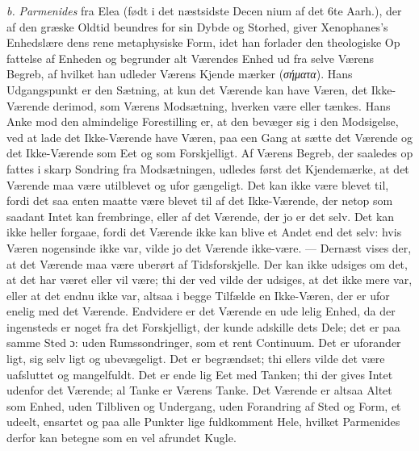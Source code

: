 \documentclass[12pt,a4paper]{book}
\newcommand{\gk}[1]{\textit{#1}}
\begin{document}
\textit{b.} \emph{Parmenides} fra Elea (født i det næstsidste Decen\-%
nium af det 6te Aarh.), der af den græske Oldtid beundres for
sin Dybde og Storhed, giver Xenophanes's Enhedslære dens
rene metaphysiske Form, idet han forlader den theologiske Op\-%
fattelse af Enheden og begrunder alt Værendes Enhed ud fra
%
%
%
selve Værens Begreb, af hvilket han udleder Værens Kjende\-%
mærker (\gk{σήματα}). Hans Udgangspunkt er den Sætning, at
kun det Værende kan have Væren, det Ikke-Værende derimod,
som Værens Modsætning, hverken være eller tænkes. Hans
Anke mod den almindelige Forestilling er, at den bevæger sig
i den Modsigelse, ved at lade det Ikke-Værende have Væren,
paa een Gang at sætte det Værende og det Ikke-Værende som
Eet og som Forskjelligt. Af Værens Begreb, der saaledes op\-%
fattes i skarp Sondring fra Modsætningen, udledes først det
Kjendemærke, at det Værende maa være utilblevet og ufor\-%
gængeligt. Det kan ikke være blevet til, fordi det saa enten
maatte være blevet til af det Ikke-Værende, der netop som
saadant Intet kan frembringe, eller af det Værende, der jo er
det selv. Det kan ikke heller forgaae, fordi det Værende ikke
kan blive et Andet end det selv: hvis Væren nogensinde ikke
var, vilde jo det Værende ikke-være. --- Dernæst vises der,
at det Værende maa være uberørt af Tidsforskjelle. Der kan
ikke udsiges om det, at det har været eller vil være; thi der\-%
ved vilde der udsiges, at det ikke mere var, eller at det endnu
ikke var, altsaa i begge Tilfælde en Ikke-Væren, der er ufor\-%
enelig med det Værende. Endvidere er det Værende en ude\-%
lelig Enhed, da der ingensteds er noget fra det Forskjelligt,
der kunde adskille dets Dele; det er paa samme Sted ɔ: uden
Rumssondringer, som et rent Continuum. Det er uforander\-%
ligt, sig selv ligt og ubevægeligt. Det er begrændset; thi
ellers vilde det være uafsluttet og mangelfuldt. Det er ende\-%
lig Eet med Tanken; thi der gives Intet udenfor det Værende;
al Tanke er Værens Tanke. Det Værende er altsaa Altet som
Enhed, uden Tilbliven og Undergang, uden Forandring af
Sted og Form, et udeelt, ensartet og paa alle Punkter lige
fuldkomment Hele, hvilket Parmenides derfor kan betegne som
en vel afrundet Kugle.
\end{document}
